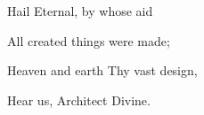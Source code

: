 \begin{flushleft}
\small
Hail Eternal, by whose aid\par
All created things were made;\par
Heaven and earth Thy vast design,\par
Hear us, Architect Divine.
\end{flushleft}
